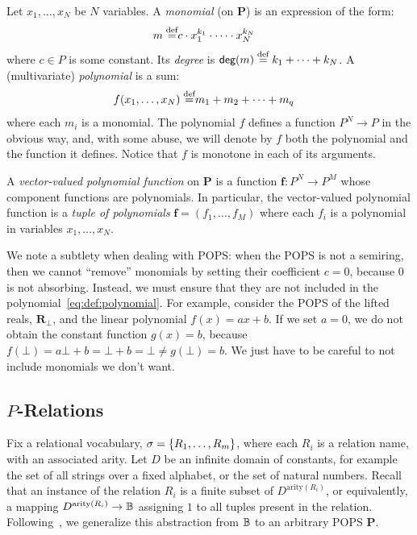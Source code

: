 Let $x_1, \ldots, x_N$ be $N$ variables.  A {\em monomial} (on $\bm P$) is an
expression of the form:
%
\begin{align}
  m \stackrel{\text{def}}{=} & c \cdot x_1^{k_1}\cdot \cdots \cdot x_N^{k_N} \label{eq:def:monomial}
\end{align}
%
where $c \in P$ is some constant.  Its {\em degree} is
$\text{\sf deg}(m) \stackrel{\text{def}}{=} k_1+\cdots+k_N$.  A (multivariate) {\em polynomial}
is a sum:
%
\begin{align}
  f(x_1, \ldots, x_N) \stackrel{\text{def}}{=} & m_1 + m_2 + \cdots + m_q \label{eq:def:polynomial}
\end{align}
%
where each $m_i$ is a monomial.  The polynomial $f$ defines a function
$P^N \rightarrow P$ in the obvious way, and, with some abuse,
we will denote by $f$ both the polynomial and the function it defines.
Notice that $f$ is monotone in each of its arguments.

A {\em vector-valued polynomial function} on $\bm P$ is a function
$\bm f : P^N \rightarrow P^M$ whose component functions are polynomials.
In particular, the vector-valued polynomial function is a
{\em tuple of polynomials} $\bm f = (f_1, \ldots, f_M)$ where each $f_i$ is a
polynomial in variables $x_1, \ldots, x_N$.

We note a subtlety when dealing with POPS:
when the POPS is not a semiring, then we cannot ``remove'' monomials
by setting their coefficient $c=0$, because $0$ is not absorbing.
Instead, we must ensure that they are not included in the polynomial~\eqref{eq:def:polynomial}.
For example, consider the POPS of the lifted reals, $\bm R_\bot$, and
the linear polynomial $f(x) = ax + b$.  If we set $a = 0$, we do not
obtain the constant function $g(x)=b$, because
$f(\bot) = a\bot + b = \bot + b = \bot \neq g(\bot)=b$.  We just have
to be careful to not include monomials we don't want.

\subsection{\texorpdfstring{$P$-Relations}{P-Relations}}

\label{subsec:p:relations}

Fix a relational vocabulary, $\sigma = \{R_1, \ldots, R_m\}$, where
each $R_i$ is a relation name, with an associated arity.  Let $D$ be
an infinite domain of constants, for example the set of all strings
over a fixed alphabet, or the set of natural numbers.  Recall that an
instance of the relation $R_i$ is a finite subset of
$D^{\text{arity}(R_i)}$, or equivalently, a mapping
$D^{\text{arity}(R_i)} \rightarrow \mathbb B$ assigning $1$ to all tuples
present in the relation.  Following~\cite{DBLP:conf/pods/GreenKT07},
we generalize this abstraction from $\mathbb B$ to an arbitrary POPS $\bm P$.

